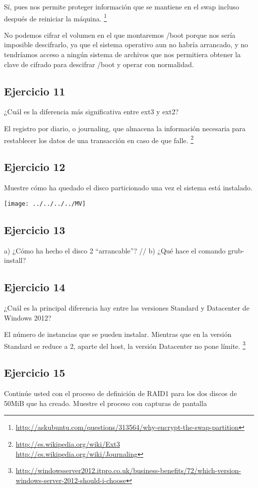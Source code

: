 \documentclass[a4paper, 11pt]{article} %
\begin{document}
Sí, pues nos permite proteger información que se mantiene en el swap incluso después de reiniciar la máquina. 
\footnote{\url{http://askubuntu.com/questions/313564/why-encrypt-the-swap-partition}}

No podemos cifrar el volumen en el que montaremos /boot porque nos sería imposible descifrarlo, ya que el sistema operativo aun no habría arrancado, y no tendríamos acceso a ningún sistema de archivos que nos permitiera obtener la clave de cifrado para descifrar /boot y operar con normalidad. 

\subsection*{Ejercicio 11}
¿Cuál es la diferencia más significativa entre ext3 y ext2?

El registro por diario, o journaling, que almacena la información necesaria para restablecer los datos de una transacción en caso de que falle. \footnote{\url{http://es.wikipedia.org/wiki/Ext3} \\ \url{http://es.wikipedia.org/wiki/Journaling}}

\pagebreak

\subsection*{Ejercicio 12}
Muestre cómo ha quedado el disco particionado una vez el sistema está
instalado.

\texttt{[image: ../../../../MV]}

\subsection*{Ejercicio 13}
a) ¿Cómo ha hecho el disco 2 “arrancable”? //
b) ¿Qué hace el comando grub-install?


\subsection*{Ejercicio 14}
¿Cuál es la principal diferencia hay entre las versiones Standard y
Datacenter de Windows 2012?

El número de instancias que se pueden instalar. Mientras que en la versión Standard se reduce a 2, aparte del host, la versión Datacenter no pone límite. \footnote{\url{http://windowsserver2012.itpro.co.uk/business-benefits/72/which-version-windows-server-2012-should-i-choose}}


\subsection*{Ejercicio 15}
Continúe usted con el proceso de definición de RAID1 para los dos discos
de 50MiB que ha creado. Muestre el proceso con capturas de pantalla
\end{document}
